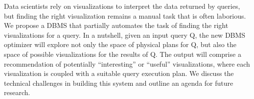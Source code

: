 Data scientists rely on visualizations to interpret the data returned by
queries, but finding the right visualization remains a manual task that is often
laborious. We propose a DBMS that partially automates the task of finding the
right visualizations for a query. In a nutshell, given an input query Q, the new
DBMS optimizer will explore not only the space of physical plans for Q, but also
the space of possible visualizations for the results of Q. The output will
comprise a recommendation of potentially ``interesting'' or ``useful''
visualizations, where each visualization is coupled with a suitable query
execution plan. We discuss the technical challenges in building this system and
outline an agenda for future research.
